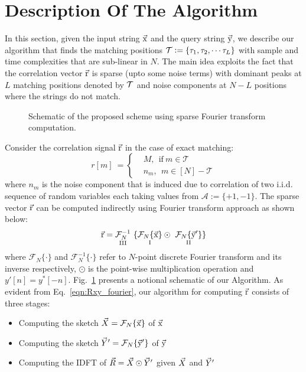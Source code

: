 \section{Description Of The Algorithm}
\label{sec:Algo_desc}
In this section, given the input string $\vec{\mathrm{x}}$ and the query string $\vec{\mathrm{y}}$, we describe our algorithm that finds the matching positions $\mathcal{T}\mathrel{\mathop:}= \{\tau_1, \tau_2, \cdots \tau_L\}$ with sample and time complexities that are sub-linear in $N$. The main idea exploits the fact that the correlation vector $\vec{\mathrm{r}}$ is sparse (upto some noise terms) with dominant peaks at $L$ matching positions denoted by $\mathcal{T}$ and noise components at $N-L$ positions where the strings do not match.
\begin{figure}[t!]
  \centering
	 	\resizebox{0.95\textwidth}{!}{}	
	\caption{Schematic of the proposed scheme using sparse Fourier transform computation.}\label{fig:notional}
\end{figure}

Consider the correlation signal $\vec{\mathrm{r}}$ in the case of exact matching:
\begin{equation} \label{eqn:RXY_sparse}
r[m] \ = \left\{
\begin{array}{ll}
  &M,~~  \text{if} \ m \in \mathcal{T} \\
  & n_m,~~ m \in [N]-\mathcal{T}
\end{array}
\right.
\end{equation}
where $n_m$ is the noise component that is induced due to correlation of two i.i.d. sequence of random variables each taking values from $\mathcal{A} := \{+1,-1\}$. The sparse vector $\vec{\mathrm{r}}$ can be computed indirectly using Fourier transform approach as shown below:
\begin{equation}\label{eqn:Rxy_fourier}
  \rv = \underset{\text{ \RNum{3} } } {\mathcal{F}_{N}^{-1}} \ \{ \underset{\text{ \RNum{1} } }{  \mathcal{F}_{N}\{\xv\}}  \odot \ \underset{\text{ \RNum{2} } }{ \mathcal{F}_{N}\{\yv'\}}  \}
\end{equation}
where $\mathcal{F}_{N}\{ \cdot \}$ and $\mathcal{F}_{N}^{-1}\{ \cdot \}$ refer to $N$-point discrete Fourier transform and its inverse respectively, $\odot$ is the point-wise multiplication operation and ${ y'[n]} = { y^{*}[-n]}$. Fig.~\ref{fig:notional} presents a notional schematic of our Algorithm. As evident from Eq.~\eqref{eqn:Rxy_fourier}, our algorithm for computing $\vec{\mathrm{r}}$ consists of three stages:
\begin{itemize}
\item Computing the sketch $\vec{X}=\mathcal{F}_{N}\{\vec{\mathrm{x}}\}$ of $\vec{\mathrm{x}}$
\item Computing the sketch $\vec{Y}'=\mathcal{F}_{N}\{\vec{\mathrm{y}}'\}$ of $\vec{\mathrm{y}}$
\item Computing the IDFT of $\vec{R}=\vec{X} \odot \vec{Y}'$ given $\vec{X}$ and $\vec{Y}'$
\end{itemize}

